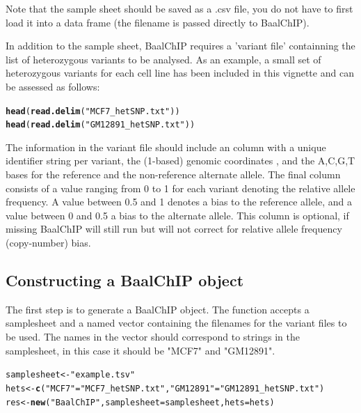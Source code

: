\documentclass{article}\usepackage[]{graphicx}\usepackage[usenames,dvipsnames]{color}
\makeatletter
\newcommand{\hlstr}[1]{\textcolor[rgb]{0.192,0.494,0.8}{#1}}%
\newcommand{\hlstd}[1]{\textcolor[rgb]{0.345,0.345,0.345}{#1}}%
\newcommand{\hlkwb}[1]{\textcolor[rgb]{0.69,0.353,0.396}{#1}}%
\newcommand{\hlkwc}[1]{\textcolor[rgb]{0.333,0.667,0.333}{#1}}%
\newcommand{\hlkwd}[1]{\textcolor[rgb]{0.737,0.353,0.396}{\textbf{#1}}}%
\newenvironment{kframe}{%
 \def\at@end@of@kframe{}%
 \ifinner\ifhmode%
  \def\at@end@of@kframe{\end{minipage}}%
  \begin{minipage}{\columnwidth}%
 \fi\fi%
 \def\FrameCommand##1{\hskip\@totalleftmargin \hskip-\fboxsep
 \colorbox{shadecolor}{##1}\hskip-\fboxsep
     \hskip-\linewidth \hskip-\@totalleftmargin \hskip\columnwidth}%
 \MakeFramed {\advance\hsize-\width
   \@totalleftmargin\z@ \linewidth\hsize
   \@setminipage}}%
 {\par\unskip\endMakeFramed%
 \at@end@of@kframe}
\newenvironment{knitrout}{}{} %
\makeatother
\begin{document}
Note that the sample sheet should be saved as a .csv file, you do not have to first load it into a data frame (the filename is passed directly to BaalChIP).

In addition to the sample sheet, BaalChIP requires a 'variant file' containning the list of heterozygous variants to be analysed. As an example, a small set of heterozygous variants for each cell line has been included in this vignette and can be assessed as follows:

\begin{knitrout}
\color{fgcolor}\begin{kframe}
\begin{alltt}
\hlkwd{head}\hlstd{(}\hlkwd{read.delim}\hlstd{(}\hlstr{"MCF7_hetSNP.txt"}\hlstd{))}
\hlkwd{head}\hlstd{(}\hlkwd{read.delim}\hlstd{(}\hlstr{"GM12891_hetSNP.txt"}\hlstd{))}
\end{alltt}
\end{kframe}
\end{knitrout}

The information in the variant file should include an  column with a unique identifier string per variant, the (1-based) genomic coordinates , and the A,C,G,T bases for the reference  and the non-reference alternate  allele. The final column  consists of a 
value ranging from 0 to 1 for each variant denoting the relative allele frequency. A value between 0.5 and 1 denotes a bias to the reference allele, and a value between 0 and 0.5 a bias to the alternate allele. This column is optional, if missing BaalChIP will still run but will not correct for relative allele frequency (copy-number) bias.


\subsection{Constructing a BaalChIP object}

The first step is to generate a BaalChIP object. The function  accepts a samplesheet and a named vector containing the filenames for the variant files to be used. The names in the vector should correspond to  strings in the  samplesheet, in this case it should be "MCF7" and "GM12891".

\begin{knitrout}
\color{fgcolor}\begin{kframe}
\begin{alltt}
\hlstd{samplesheet} \hlkwb{<-} \hlstr{"example.tsv"}
\hlstd{hets} \hlkwb{<-} \hlkwd{c}\hlstd{(}\hlstr{"MCF7"}\hlstd{=}\hlstr{"MCF7_hetSNP.txt"}\hlstd{,} \hlstr{"GM12891"}\hlstd{=}\hlstr{"GM12891_hetSNP.txt"}\hlstd{)}
\hlstd{res} \hlkwb{<-} \hlkwd{new}\hlstd{(}\hlstr{"BaalChIP"}\hlstd{,} \hlkwc{samplesheet}\hlstd{=samplesheet,} \hlkwc{hets}\hlstd{=hets)}
\end{alltt}
\end{kframe}
\end{knitrout}
\end{document}

